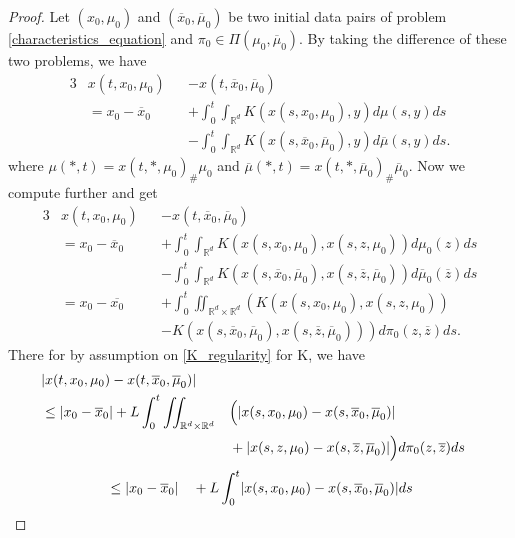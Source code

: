 \begin{proof}
  Let $(x_{0},\mu_0)$  and $(\overline{x}_0,\overline{\mu }_0  )$ be two initial data pairs of problem \autoref{characteristics_equation}
  and $\pi_0 \in  \Pi (\mu_0,\overline{\mu }_0 )$. By taking the difference of these two problems, we have 
  \begin{alignat*}{3}
    &x(t,x_{0},\mu_0) &&- x(t,\overline{x}_0,\overline{\mu }_0  ) \\
    &= x_{0}-\overline{x}_0 &&+ \int_0^{t} \int_{\mathbb{R}^{d} }   K(x(s,x_{0},\mu_0),y) d\mu(s,y) ds  \\
    & &&- \int_0^{t} \int_{\mathbb{R}^{d} } K(x(s,\overline{x}_0,\overline{\mu }_0),y) d \overline{\mu }(s,y)ds
  .\end{alignat*}
where $\mu(*,t) = x(t,*,\mu_0)_\# \mu_0$ and $\overline{\mu }(*,t) = x(t,*,\overline{\mu }_0 )_\# \overline{\mu }_0$. Now we compute further and get 
\begin{alignat*}{3}
  &x(t,x_{0},\mu_0) &&- x(t,\overline{x}_0,\overline{\mu }_0  )\\
  &= x_{0}-\overline{x}_0 &&+ \int_0^{t} \int_{\mathbb{R}^{d} } K(x(s,x_{0},\mu_0),x(s,z,\mu_0)) d\mu_0(z) ds \\
  & &&- \int_0^{t} \int_{\mathbb{R}^{d} } K(x(s,\overline{x}_0,\overline{\mu }_0  ),x(s,\overline{z},\overline{\mu }_0  )) d \overline{\mu }_0(\overline{z} )  ds\\
  &= x_0 - \overline{x_0}  &&+ \int_0^{t} \iint_{\mathbb{R}^{d} \times  \mathbb{R}^{d}  } \left(K(x(s,x_{0},\mu_0),x(s,z,\mu_0)) \right.\\
  & &&-\left. K(x(s,\overline{x}_0,\overline{\mu }_0  ),x(s,\overline{z},\overline{\mu }_0  ))\right) d\pi_0(z,\overline{z} ) ds
.\end{alignat*}
There for by assumption on \autoref{K_regularity} for K, we have 
\begin{alignat*}{3}
  &\lvert x(t,x_{0},\mu_0) - x(t,\overline{x}_0,\overline{\mu }_0  )\rvert  \\
  &\le \lvert x_{0}-\overline{x}_0 \rvert + L \int_0^{t} \iint_{\mathbb{R}^{d} \times  \mathbb{R}^{d}  }&&\Big(\lvert x(s,x_{0},\mu_0)- x(s,\overline{x}_0,\overline{\mu }_0  )\rvert  \\
  &  &&+ \lvert x(s,z,\mu_0) - x(s,\overline{z},\overline{\mu }_0  )\rvert\Big)  d\pi_0(z,\overline{z} ) ds
\end{alignat*}
\vspace{-\baselineskip}
\begin{alignat*}{3}
  &\le \abs{x_{0}-\overline{x}_0 } &&+ L \int_0^{t} \abs{x(s,x_{0},\mu_0)- x(s,\overline{x}_0,\overline{\mu }_0  )} ds \\

\end{alignat*}
\end{proof}
